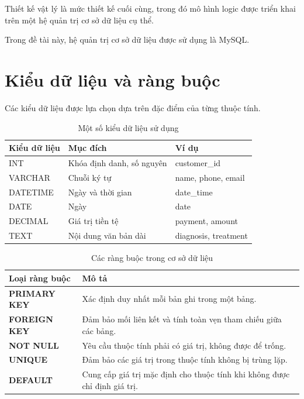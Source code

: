 Thiết kế vật lý là mức thiết kế cuối cùng, trong đó mô hình logic được triển khai trên một hệ quản trị cơ sở dữ liệu cụ thể.

Trong đề tài này, hệ quản trị cơ sở dữ liệu được sử dụng là MySQL.

\section{Kiểu dữ liệu và ràng buộc}

Các kiểu dữ liệu được lựa chọn dựa trên đặc điểm của từng thuộc tính.

\begin{table}[htbp]
    \centering
    \caption{Một số kiểu dữ liệu sử dụng}
    \label{tab:data_types}
    \begin{tabularx}{\textwidth}{|p{3cm}|X|p{5cm}|}
        \hline
        \textbf{Kiểu dữ liệu} & \textbf{Mục đích} & \textbf{Ví dụ} \\ \hline
        INT & Khóa định danh, số nguyên & customer\_id \\ \hline
        VARCHAR & Chuỗi ký tự & name, phone, email \\ \hline
        DATETIME & Ngày và thời gian & date\_time \\ \hline
        DATE & Ngày & date \\ \hline
        DECIMAL & Giá trị tiền tệ & payment, amount \\ \hline
        TEXT & Nội dung văn bản dài & diagnosis, treatment \\ \hline
    \end{tabularx}
\end{table}

\begin{table}[htbp]
    \centering
    \caption{Các ràng buộc trong cơ sở dữ liệu}
    \label{tab:constraints}
    \begin{tabularx}{\textwidth}{|p{4cm}|X|}
        \hline
        \textbf{Loại ràng buộc} & \textbf{Mô tả} \\ \hline

        \textbf{PRIMARY KEY} &
        Xác định duy nhất mỗi bản ghi trong một bảng.
        \\ \hline

        \textbf{FOREIGN KEY} &
        Đảm bảo mối liên kết và tính toàn vẹn tham chiếu giữa các bảng.
        \\ \hline

        \textbf{NOT NULL} &
        Yêu cầu thuộc tính phải có giá trị, không được để trống.
        \\ \hline

        \textbf{UNIQUE} &
        Đảm bảo các giá trị trong thuộc tính không bị trùng lặp.
        \\ \hline

        \textbf{DEFAULT} &
        Cung cấp giá trị mặc định cho thuộc tính khi không được chỉ định giá trị.
        \\ \hline

    \end{tabularx}
\end{table}

